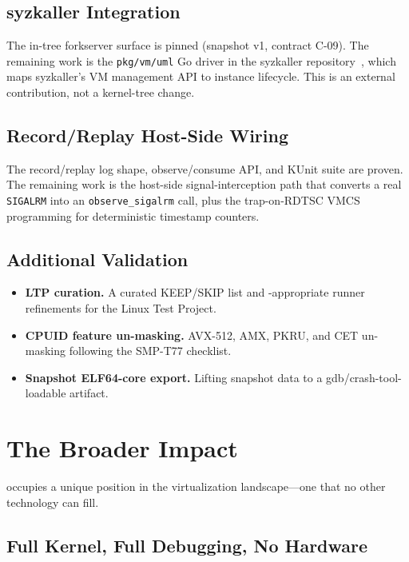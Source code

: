 \subsection{syzkaller Integration}

The in-tree forkserver surface is pinned (snapshot v1, contract
C-09).  The remaining work is the \texttt{pkg/vm/uml} Go driver in
the syzkaller repository~\cite{syzkaller}, which maps syzkaller's VM
management API to \UML{} instance lifecycle.  This is an external
contribution, not a kernel-tree change.

\subsection{Record/Replay Host-Side Wiring}

The record/replay log shape, observe/consume API, and KUnit suite are
proven.  The remaining work is the host-side signal-interception path
that converts a real \texttt{SIGALRM} into an
\texttt{observe\_sigalrm} call, plus the trap-on-RDTSC VMCS
programming for deterministic timestamp counters.

\subsection{Additional Validation}

\begin{itemize}[leftmargin=2em]
  \item \textbf{LTP curation.}  A curated KEEP/SKIP list and
    \UML{}-appropriate runner refinements for the Linux Test Project.
  \item \textbf{CPUID feature un-masking.}  AVX-512, AMX, PKRU, and
    CET un-masking following the SMP-T77 checklist.
  \item \textbf{Snapshot ELF64-core export.}  Lifting snapshot data
    to a gdb/crash-tool-loadable artifact.
\end{itemize}


\section{The Broader Impact}
\label{sec:conclusion-impact}

\UML{} occupies a unique position in the virtualization landscape---one
that no other technology can fill.

\subsection{Full Kernel, Full Debugging, No Hardware}

